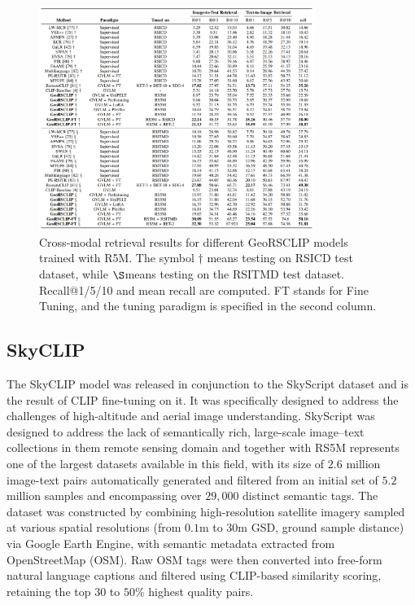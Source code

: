 \documentclass[a4paper, oneside, english]{sapthesis} %
\begin{document}
\begin{figure}[H]
    \centering
    \includegraphics[width=0.8\textwidth]{img/georsclip-retrieval-performance.png}
    \caption{Cross-modal retrieval results for different GeoRSCLIP models trained with R5M. The symbol $\dagger$ means testing on RSICD test dataset, while $\S$means testing on the RSITMD test dataset. Recall@1/5/10 and mean recall are computed. FT stands for Fine Tuning, and the tuning paradigm is specified in the second column.}
    \label{fig:georsclip-performance}
\end{figure}


\subsection{SkyCLIP}

The SkyCLIP model \cite{wang2024skyscript} was released in conjunction to the SkyScript dataset and is the result of CLIP fine-tuning on it. It was specifically designed to address the challenges of high-altitude and aerial image understanding. SkyScript was designed to address the lack of semantically rich, large-scale image–text collections in them remote sensing domain and together with RS5M \cite{zhang2024rs5m} represents one of the largest datasets available in this field, with its size of $2.6$ million image-text pairs automatically generated and filtered from an initial set of $5.2$ million samples and encompassing over $29,000$ distinct semantic tags. The dataset was constructed by combining high-resolution satellite imagery sampled at various spatial resolutions (from $0.1$m to $30$m GSD, ground sample distance) via Google Earth Engine, with semantic metadata extracted from OpenStreetMap (OSM). Raw OSM tags were then converted into free-form natural language captions and filtered using CLIP-based similarity scoring, retaining the top $30$ to $50\%$ highest quality pairs.
\end{document}
